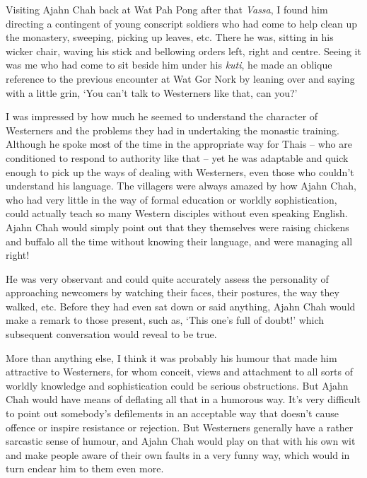 Visiting Ajahn Chah back at Wat Pah Pong after that \emph{Vassa}, I
found him directing a contingent of young conscript soldiers who had
come to help clean up the monastery, sweeping, picking up leaves, etc. 
There he was, sitting in his wicker chair, waving his stick and
bellowing orders left, right and centre. Seeing it was me who had come
to sit beside him under his \emph{kuti}, he made an oblique reference to
the previous encounter at Wat Gor Nork by leaning over and saying with a
little grin, `You can't talk to Westerners like that, can you?'

I was impressed by how much he seemed to understand the character of
Westerners and the problems they had in undertaking the monastic
training. Although he spoke most of the time in the appropriate way for
Thais -- who are conditioned to respond to authority like that -- yet he
was adaptable and quick enough to pick up the ways of dealing with
Westerners, even those who couldn't understand his language. The
villagers were always amazed by how Ajahn Chah, who had very little in
the way of formal education or worldly sophistication, could actually
teach so many Western disciples without even speaking English. Ajahn
Chah would simply point out that they themselves were raising chickens
and buffalo all the time without knowing their language, and were
managing all right! 

He was very observant and could quite accurately assess the personality
of approaching newcomers by watching their faces, their postures, the
way they walked, etc. Before they had even sat down or said anything, 
Ajahn Chah would make a remark to those present, such as, `This one's
full of doubt!' which subsequent conversation would reveal to be true. 

More than anything else, I think it was probably his humour that made
him attractive to Westerners, for whom conceit, views and attachment to
all sorts of worldly knowledge and sophistication could be serious
obstructions. But Ajahn Chah would have means of deflating all that in a
humorous way. It's very difficult to point out somebody's defilements in
an acceptable way that doesn't cause offence or inspire resistance or
rejection. But Westerners generally have a rather sarcastic sense of
humour, and Ajahn Chah would play on that with his own wit and make
people aware of their own faults in a very funny way, which would in
turn endear him to them even more. 

